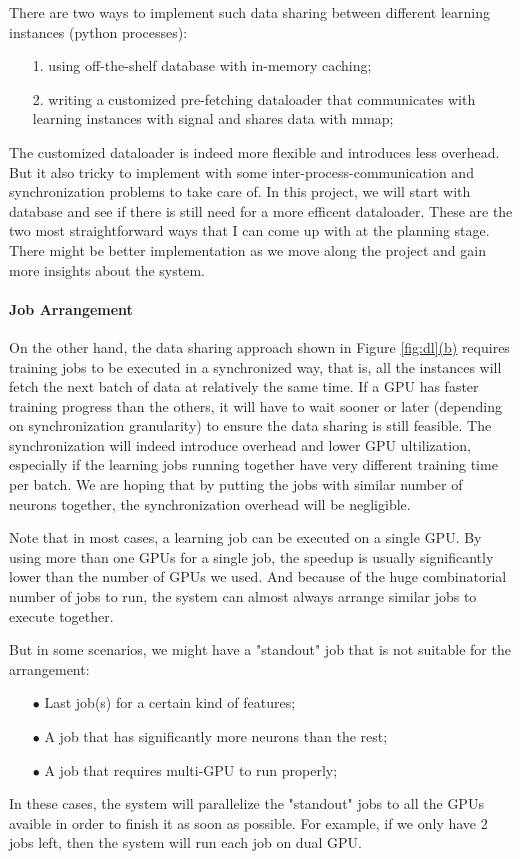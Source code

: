 \documentclass[conference]{IEEEtran}
\begin{document}
There are two ways to implement such data sharing between different learning instances (python processes): 

\begin{itemize}
	\item[1.]  using off-the-shelf database with in-memory caching;
	\item[2.]  writing a customized pre-fetching dataloader that communicates with learning instances with signal and shares data with mmap;
\end{itemize}

The customized dataloader is indeed more flexible and introduces less overhead. 
But it also tricky to implement with some inter-process-communication and synchronization problems to take care of. 
In this project, we will start with database and see if there is still need for a more efficent dataloader. 
These are the two most straightforward ways that I can come up with at the planning stage. 
There might be better implementation as we move along the project and gain more insights about the system. 

\paragraph{Job Arrangement}
On the other hand, the data sharing approach shown in Figure \ref{fig:dl}\hyperref[dl_b]{(b)} requires training jobs to be executed in a synchronized way, that is, all the instances will fetch the next batch of data at relatively the same time. 
If a GPU has faster training progress than the others, it will have to wait sooner or later (depending on synchronization granularity) to ensure the data sharing is still feasible. 
The synchronization will indeed introduce overhead and lower GPU ultilization, especially if the learning jobs running together have very different training time per batch. 
We are hoping that by putting the jobs with similar number of neurons together, the synchronization overhead will be negligible. 

Note that in most cases, a learning job can be executed on a single GPU. 
By using more than one GPUs for a single job, the speedup is usually significantly lower than the number of GPUs we used. 
And because of the huge combinatorial number of jobs to run, the system can almost always arrange similar jobs to execute together. 

But in some scenarios, we might have a "standout" job that is not suitable for the arrangement:
\begin{itemize}
	\item[$\bullet$]  Last job(s) for a certain kind of features;
	\item[$\bullet$]  A job that has significantly more neurons than the rest;
	\item[$\bullet$]  A job that requires multi-GPU to run properly; 
\end{itemize}
In these cases, the system will parallelize the "standout" jobs to all the GPUs avaible in order to finish it as soon as possible. 
For example, if we only have 2 jobs left, then the system will run each job on dual GPU.
\end{document}
